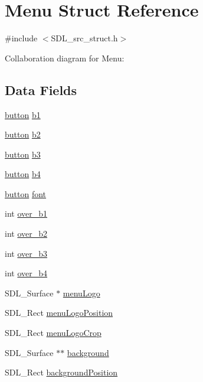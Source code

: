 \hypertarget{structMenu}{}\section{Menu Struct Reference}
\label{structMenu}


{\ttfamily \#include $<$S\+D\+L\+\_\+src\+\_\+struct.\+h$>$}



Collaboration diagram for Menu\+:
\subsection*{Data Fields}
\begin{DoxyCompactItemize}
\item 
\mbox{\hyperlink{structbutton}{button}} \mbox{\hyperlink{structMenu_a4e551cc9d8e601477c9b433586e94e85}{b1}}
\item 
\mbox{\hyperlink{structbutton}{button}} \mbox{\hyperlink{structMenu_a6fb16be02b74f37999a5bcbe533acf06}{b2}}
\item 
\mbox{\hyperlink{structbutton}{button}} \mbox{\hyperlink{structMenu_a28dd906295886472d4a1ea8e8891dd87}{b3}}
\item 
\mbox{\hyperlink{structbutton}{button}} \mbox{\hyperlink{structMenu_afa19f7b80780740b37f639305dac3ca2}{b4}}
\item 
\mbox{\hyperlink{structbutton}{button}} \mbox{\hyperlink{structMenu_a4b2624c70703c7855f423289bc815eaf}{font}}
\item 
int \mbox{\hyperlink{structMenu_a0ba92851941ea1b803bbd6f2ba66ff89}{over\+\_\+b1}}
\item 
int \mbox{\hyperlink{structMenu_a784b690794a131e672b4a3107c2431ac}{over\+\_\+b2}}
\item 
int \mbox{\hyperlink{structMenu_a5310cc8336a6ec6e540f519428dbef60}{over\+\_\+b3}}
\item 
int \mbox{\hyperlink{structMenu_a1c5318e7c3fd0b29aa561615c1de7f59}{over\+\_\+b4}}
\item 
S\+D\+L\+\_\+\+Surface $\ast$ \mbox{\hyperlink{structMenu_ad9acec5d1836a35b00b5cd23769dbeab}{menu\+Logo}}
\item 
S\+D\+L\+\_\+\+Rect \mbox{\hyperlink{structMenu_a44028594dd9fbdb584b145b08d8984e4}{menu\+Logo\+Position}}
\item 
S\+D\+L\+\_\+\+Rect \mbox{\hyperlink{structMenu_aa5370ac0ac889cb35b4cdf96a2de4a89}{menu\+Logo\+Crop}}
\item 
S\+D\+L\+\_\+\+Surface $\ast$$\ast$ \mbox{\hyperlink{structMenu_a7ec6851118a11d54ac1963d488bbb5cb}{background}}
\item 
S\+D\+L\+\_\+\+Rect \mbox{\hyperlink{structMenu_a9c8a65d7ff9e74cfd8df6a56c39fb426}{background\+Position}}
\end{DoxyCompactItemize}


